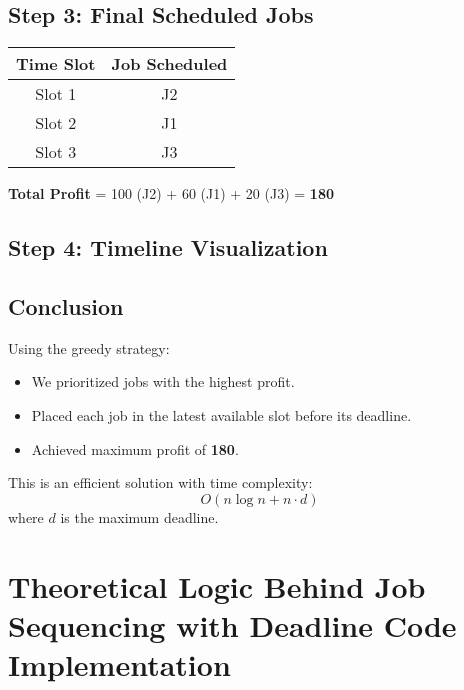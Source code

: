 \documentclass[14pt]{extarticle}
\begin{document}
\subsection{Step 3: Final Scheduled Jobs}

\begin{center}
\begin{tabular}{|c|c|}
\hline
\textbf{Time Slot} & \textbf{Job Scheduled} \\
\hline
Slot 1 & J2 \\
Slot 2 & J1 \\
Slot 3 & J3 \\
\hline
\end{tabular}
\end{center}

\textbf{Total Profit} = 100 (J2) + 60 (J1) + 20 (J3) = \textbf{180}

\subsection{Step 4: Timeline Visualization}

\begin{center}
\end{center}

\subsection{Conclusion}
Using the greedy strategy:
\begin{itemize}
    \item We prioritized jobs with the highest profit.
    \item Placed each job in the latest available slot before its deadline.
    \item Achieved maximum profit of \textbf{180}.
\end{itemize}

This is an efficient solution with time complexity:
\[
O(n \log n + n \cdot d)
\]
where $d$ is the maximum deadline.

\newpage
\section{Theoretical Logic Behind Job Sequencing with Deadline Code Implementation}
\end{document}
